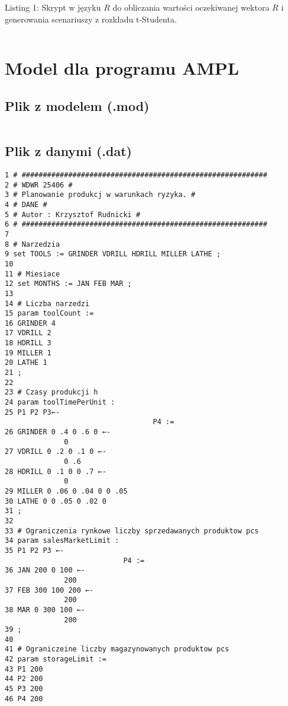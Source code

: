 \documentclass{article}
\begin{document}
Listing 1: Skrypt w języku $R$ do obliczania wartości oczekiwanej wektora $R$ i generowania scenariuszy z rozkładu t-Studenta.

\inputminted[autogobble]{R}{../WDWR.r}

\section{Model dla programu AMPL}

\subsection{Plik z modelem (.mod)}

\inputminted[autogobble]{R}{../WDWR1.mod}

\subsection{Plik z danymi (.dat)}

\begin{verbatim}
1 # ##########################################################
2 # WDWR 25406 #
3 # Planowanie produkcj w warunkach ryzyka. #
4 # DANE #
5 # Autor : Krzysztof Rudnicki #
6 # ##########################################################
7
8 # Narzedzia
9 set TOOLS := GRINDER VDRILL HDRILL MILLER LATHE ;
10
11 # Miesiace
12 set MONTHS := JAN FEB MAR ;
13
14 # Liczba narzedzi
15 param toolCount :=
16 GRINDER 4
17 VDRILL 2
18 HDRILL 3
19 MILLER 1
20 LATHE 1
21 ;
22
23 # Czasy produkcji h
24 param toolTimePerUnit :
25 P1 P2 P3←-
                                   P4 :=
26 GRINDER 0 .4 0 .6 0 ←-
              0
27 VDRILL 0 .2 0 .1 0 ←-
              0 .6
28 HDRILL 0 .1 0 0 .7 ←-
              0
29 MILLER 0 .06 0 .04 0 0 .05
30 LATHE 0 0 .05 0 .02 0
31 ;
32
33 # Ograniczenia rynkowe liczby sprzedawanych produktow pcs
34 param salesMarketLimit :
35 P1 P2 P3 ←-
                            P4 :=
36 JAN 200 0 100 ←-
              200
37 FEB 300 100 200 ←-
              200
38 MAR 0 300 100 ←-
              200
39 ;
40
41 # Ograniczeine liczby magazynowanych produktow pcs
42 param storageLimit :=
43 P1 200
44 P2 200
45 P3 200
46 P4 200
\end{verbatim}
\end{document}
